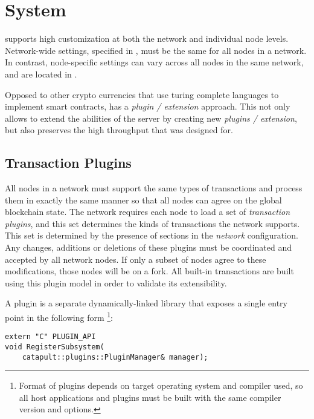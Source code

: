 \section{System}
\label{sec:system}


\codenamechapterfirstword supports high customization at both the network and individual node levels.
Network-wide settings, specified in , must be the same for all nodes in a network.
In contrast, node-specific settings can vary across all nodes in the same network, and are located in .

Opposed to other crypto currencies that use turing complete languages to implement smart contracts, \codenamespace has a \textit{plugin / extension} approach.
This not only allows to extend the abilities of the server by creating new \textit{plugins / extension}, but also preserves the high throughput that \codenamespace was designed for.

\subsection{Transaction Plugins}

All nodes in a network must support the same types of transactions and process them in exactly the same manner so that all nodes can agree on the global blockchain state.
The network requires each node to load a set of \textit{transaction plugins}, and this set determines the kinds of transactions the network supports.
This set is determined by the presence of  sections in the \textit{network} configuration.
Any changes, additions or deletions of these plugins must be coordinated and accepted by all network nodes.
If only a subset of nodes agree to these modifications, those nodes will be on a fork.
All built-in \codenamespace transactions are built using this plugin model in order to validate its extensibility.

A plugin is a separate dynamically-linked library that exposes a single entry point in the following form
\footnote{Format of plugins depends on target operating system and compiler used, so all host applications and plugins must be built with the same compiler version and options.}:

\begin{lstlisting}
extern "C" PLUGIN_API
void RegisterSubsystem(
	catapult::plugins::PluginManager& manager);
\end{lstlisting}

